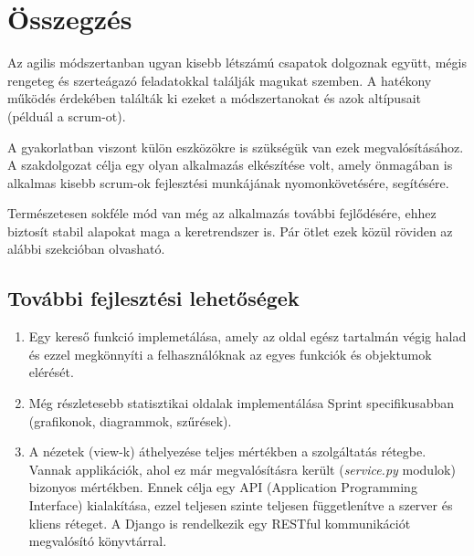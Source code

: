 \chapter{Összegzés} %
\label{ch:sum}

Az agilis módszertanban ugyan kisebb létszámú csapatok dolgoznak együtt, mégis rengeteg és szerteágazó feladatokkal találják magukat szemben. A hatékony működés érdekében találták ki ezeket a módszertanokat és azok altípusait (példuál a scrum-ot). 

A gyakorlatban viszont külön eszközökre is szükségük van ezek megvalósításához. A szakdolgozat célja egy olyan alkalmazás elkészítése volt, amely önmagában is alkalmas kisebb scrum-ok fejlesztési munkájának nyomonkövetésére, segítésére. 

Természetesen sokféle mód van még az alkalmazás további fejlődésére, ehhez biztosít stabil alapokat maga a keretrendszer is. Pár ötlet ezek közül röviden az alábbi szekcióban olvasható.

\section{További fejlesztési lehetőségek}

\begin{enumerate}
    \item Egy kereső funkció implemetálása, amely az oldal egész tartalmán végig halad és ezzel megkönnyíti a felhasználóknak az egyes funkciók és objektumok elérését.
    \item Még részletesebb statisztikai oldalak implementálása Sprint specifikusabban (grafikonok, diagrammok, szűrések).
    \item A nézetek (view-k) áthelyezése teljes mértékben a szolgáltatás rétegbe. Vannak applikációk, ahol ez már megvalósításra került (\textit{service.py} modulok) bizonyos mértékben. Ennek célja egy API (Application Programming Interface) kialakítása, ezzel teljesen szinte teljesen függetlenítve a szerver és kliens réteget.
    A Django is rendelkezik egy RESTful kommunikációt megvalósító könyvtárral.
\end{enumerate}





